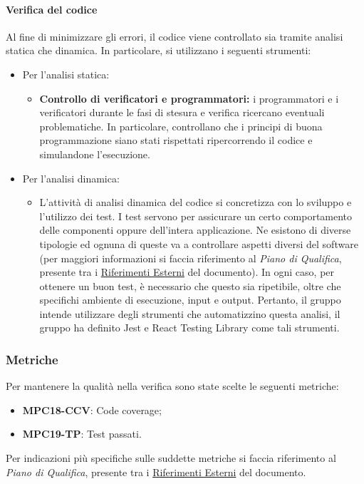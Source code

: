 \paragraph{Verifica del codice}
Al fine di minimizzare gli errori, il codice viene controllato sia tramite analisi statica che dinamica. In particolare, si utilizzano i seguenti strumenti:
\begin{itemize}
    \item Per l'analisi statica: 
        \begin{itemize}
            \item \textbf{Controllo di verificatori e programmatori:} i programmatori e i verificatori durante le fasi di stesura e verifica ricercano eventuali problematiche. In particolare, controllano che i principi di buona programmazione siano stati rispettati ripercorrendo il codice e simulandone l'esecuzione.
        \end{itemize}
    \item Per l'analisi dinamica: 
        \begin{itemize}
            \item L’attività di analisi dinamica del codice si concretizza con lo sviluppo e l’utilizzo dei test. I test servono per assicurare un certo comportamento delle componenti oppure dell’intera applicazione. Ne esistono di diverse tipologie ed ognuna di queste va a controllare aspetti diversi del software (per maggiori informazioni si faccia riferimento al \textit{Piano di Qualifica}, presente tra i \hyperref[sec:riferimenti_esterni]{Riferimenti Esterni} del documento). In ogni caso, per ottenere un buon test, è necessario che questo sia ripetibile, oltre che specifichi ambiente di esecuzione, input e output. Pertanto, il gruppo intende utilizzare degli strumenti che automatizzino questa analisi, il gruppo ha definito Jest e React Testing Library come tali strumenti.
        \end{itemize}
\end{itemize}

\subsubsection{Metriche}\label{sec:processi_di_supporto:verifica:metriche}
Per mantenere la qualità nella verifica sono state scelte le seguenti metriche:
\begin{itemize}
    \item \textbf{MPC18-CCV}: Code coverage;
    \item \textbf{MPC19-TP}: Test passati.
\end{itemize}
Per indicazioni più specifiche sulle suddette metriche si faccia riferimento al \textit{Piano di Qualifica}, presente tra i \hyperref[sec:riferimenti_esterni]{Riferimenti Esterni} del documento.

